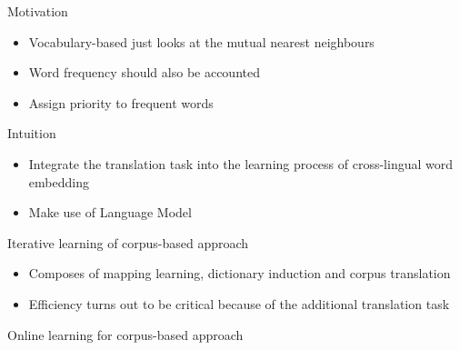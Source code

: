 \documentclass[11pt, a4paper, landscape]{article}
\begin{document}
	\NewPage
	\vfill
	Motivation
	\begin{itemize}
		\item Vocabulary-based just looks at the mutual nearest neighbours
		\item Word frequency should also be accounted
		\item Assign priority to frequent words\\
	\end{itemize}
	Intuition
	\begin{itemize}
		\item Integrate the translation task into the learning process of cross-lingual word embedding
		\item Make use of Language Model
	\end{itemize}
	\vfill


	\NewPage
	\vfill

		\centering
	\begin{minipage}{.7\linewidth}

			\begin{algorithm}[H]
				\SetAlgoLined
				\caption{Iterative learning of corpus-based approach}
			\end{algorithm}
	\end{minipage}
	\begin{itemize}
		\item Composes of mapping learning, dictionary induction and corpus translation
		\item Efficiency turns out to be critical because of the additional translation task 
	\end{itemize}

	\vfill
	
	\NewPage
	\vfill

	\centering
	\begin{minipage}{.7\linewidth}
		\begin{algorithm}[H]
			\SetAlgoLined
			\caption{Online learning for corpus-based approach}
		\end{algorithm}
	\end{minipage}
	
\end{document}
